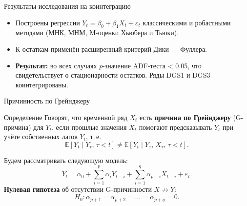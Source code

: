 \documentclass{beamer}
\begin{document}
	\begin{frame}{Результаты исследования на коинтеграцию}
		\begin{itemize}
			\item Построены регрессии $Y_t = \beta_0 + \beta_1 X_t + \varepsilon_t$ классическими и робастными методами (МНК, МНМ, M-оценки Хьюбера и Тьюки).
			\item К остаткам применён расширенный критерий Дики --- Фуллера.
			\item \textbf{Результат:} во всех случаях $p$-значение ADF-теста < 0.05, что свидетельствует о стационарности остатков. Ряды DGS1 и DGS3 коинтегрированы.
		\end{itemize}
	\end{frame}
	
	\begin{frame}{Причинность по Грейнджеру}
		\begin{block}{Определение}
			Говорят, что временной ряд $X_t$ есть \textbf{причина по Грейнджеру} (G-причина) для $Y_t$, если прошлые значения $X_t$ помогают предсказывать $Y_t$ при учёте собственных лагов $Y_t$, т.\,е.
			\begin{equation*}
				\mathbb{E} \left[ Y_t \mid Y_{\tau}, \, \tau<t \right] \ne \mathbb{E} \left[ Y_t \mid Y_{\tau}, \, X_{\tau}, \, \tau<t \right].
			\end{equation*}
		\end{block}
		Будем рассматривать следующую модель:
		\begin{equation*}
			Y_t = \alpha_0 + \sum_{i=1}^p \alpha_i Y_{t-i} + \sum_{i=1}^q \alpha_{p+i} X_{t-i} + \varepsilon_t.
		\end{equation*}
		\textbf{Нулевая гипотеза} об отсутствии G-причинности $X \not\to Y$:
		\begin{equation*}
			H_0 \colon \alpha_{p+1} = \alpha_{p+2} = \ldots = \alpha_{p+q} = 0.
		\end{equation*}
	\end{frame}
	
\end{document}
